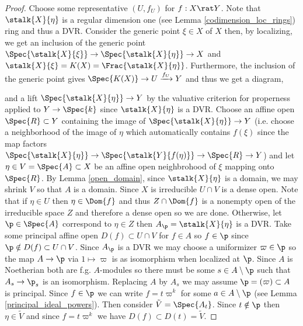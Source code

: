 \documentclass[12pt]{article}
\begin{document}
\begin{proof}
Choose some representative $(U, f_U)$ for $f : X \rat Y$. Note that $\stalk{X}{\eta}$ is a regular dimension one (see Lemma \ref{codimension_loc_rings}) ring and thus a DVR. Consider the generic point $\xi \in X$ of $X$ then, by localizing, we get an inclusion of the generic point $\Spec{\stalk{X}{\xi}} \to \Spec{\stalk{X}{\eta}} \to X$ and $\stalk{X}{\xi} = K(X) = \Frac{\stalk{X}{\eta}}$. Furthermore, the inclusion of the generic point gives $\Spec{K(X)} \to U \xrightarrow{f_U} Y$ and thus we get a diagram,
\begin{center}
\end{center}
and a lift $\Spec{\stalk{X}{\eta}} \to Y$ by the valuative criterion for properness applied to $Y \to \Spec{k}$ since $\stalk{X}{\eta}$ is a DVR. Choose an affine open $\Spec{R} \subset Y$ containing the image of $\Spec{\stalk{X}{\eta}} \to Y$ (i.e. choose a neighborhood of the image of $\eta$ which automatically contains $f(\xi)$ since the map factors $\Spec{\stalk{X}{\eta}} \to \Spec{\stalk{Y}{f(\eta)}} \to \Spec{R} \to Y$) and let $\eta \in V = \Spec{A} \subset X$ be an affine open neighbrohood of $\xi$ mapping onto $\Spec{R}$. By Lemma \ref{open_domain}, since $\stalk{X}{\eta}$ is a domain, we may shrink $V$ so that $A$ is a domain. Since $X$ is irreducible $U \cap V$ is a dense open. Note that if $\eta \in U$ then $\eta \in \Dom{f}$ and thus $Z \cap \Dom{f}$ is a nonempty open of the irreducible space $Z$ and therefore a dense open so we are done. Otherwise, let $\p \in \Spec{A}$ correspond to $\eta \in Z$ then $A_\p = \stalk{X}{\eta}$ is a  DVR. Take some principal affine open $D(f) \subset U \cap V$ for $f \in A$ so $f \in \p$ since $\p \notin D(f) \subset U \cap V$. Since $A_\p$ is a DVR we may choose a uniformizer $\varpi \in \p$ so the map $A \to \p$ via $1 \mapsto \varpi$ is as isomorphism when localized at $\p$. Since $A$ is Noetherian both are f.g. $A$-modules so there must be some $s \in A \setminus \p$ such that $A_s \to \p_s$ is an isomorphism. Replacing $A$ by $A_s$ we may assume $\p = (\varpi) \subset A$ is principal. Since $f \in \p$ we can write $f = t \varpi^k$ for some $a \in A \setminus \p$ (see Lemma \ref{principal_ideal_powers}). Then consider $\tilde{V} = \Spec{A_t}$. Since $t \notin \p$ then $\eta \in \tilde{V}$ and since $f = t \varpi^k$ we have $D(f) \subset D(t) = \tilde{V}$.

\end{proof}
\end{document}
